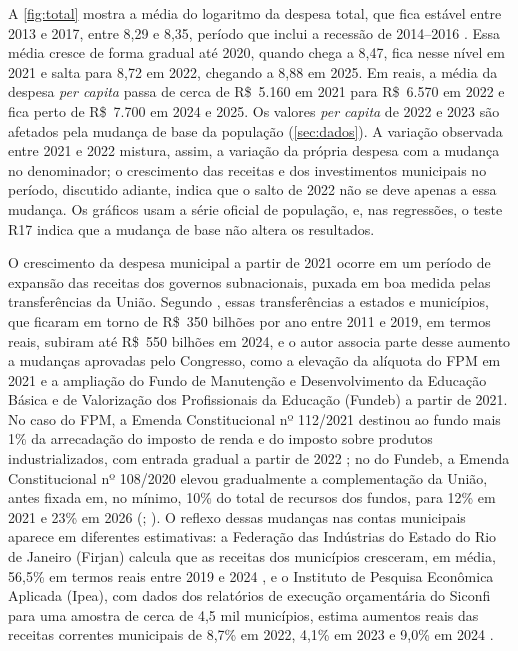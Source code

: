 A \autoref{fig:total} mostra a média do logaritmo da despesa total, que fica estável entre 2013 e 2017, entre 8,29 e 8,35, período que inclui a recessão de 2014--2016 \parencite{codace2020}. Essa média cresce de forma gradual até 2020, quando chega a 8,47, fica nesse nível em 2021 e salta para 8,72 em 2022, chegando a 8,88 em 2025. Em reais, a média da despesa \textit{per capita} passa de cerca de R\$~5.160 em 2021 para R\$~6.570 em 2022 e fica perto de R\$~7.700 em 2024 e 2025. Os valores \textit{per capita} de 2022 e 2023 são afetados pela mudança de base da população (\autoref{sec:dados}). A variação observada entre 2021 e 2022 mistura, assim, a variação da própria despesa com a mudança no denominador; o crescimento das receitas e dos investimentos municipais no período, discutido adiante, indica que o salto de 2022 não se deve apenas a essa mudança. Os gráficos usam a série oficial de população, e, nas regressões, o teste R17 indica que a mudança de base não altera os resultados.

O crescimento da despesa municipal a partir de 2021 ocorre em um período de expansão das receitas dos governos subnacionais, puxada em boa medida pelas transferências da União. Segundo \textcite{schymura2025}, essas transferências a estados e municípios, que ficaram em torno de R\$~350 bilhões por ano entre 2011 e 2019, em termos reais, subiram até R\$~550 bilhões em 2024, e o autor associa parte desse aumento a mudanças aprovadas pelo Congresso, como a elevação da alíquota do FPM em 2021 e a ampliação do Fundo de Manutenção e Desenvolvimento da Educação Básica e de Valorização dos Profissionais da Educação (Fundeb) a partir de 2021. No caso do FPM, a Emenda Constitucional nº 112/2021 destinou ao fundo mais 1\% da arrecadação do imposto de renda e do imposto sobre produtos industrializados, com entrada gradual a partir de 2022 \parencite{ec112_2021}; no do Fundeb, a Emenda Constitucional nº 108/2020 elevou gradualmente a complementação da União, antes fixada em, no mínimo, 10\% do total de recursos dos fundos, para 12\% em 2021 e 23\% em 2026 (; ). O reflexo dessas mudanças nas contas municipais aparece em diferentes estimativas: a Federação das Indústrias do Estado do Rio de Janeiro (Firjan) calcula que as receitas dos municípios cresceram, em média, 56,5\% em termos reais entre 2019 e 2024 \parencite[p.~9]{firjan2025}, e o Instituto de Pesquisa Econômica Aplicada (Ipea), com dados dos relatórios de execução orçamentária do Siconfi para uma amostra de cerca de 4,5 mil municípios, estima aumentos reais das receitas correntes municipais de 8,7\% em 2022, 4,1\% em 2023 e 9,0\% em 2024 \parencite[p.~10]{santana2025}.

